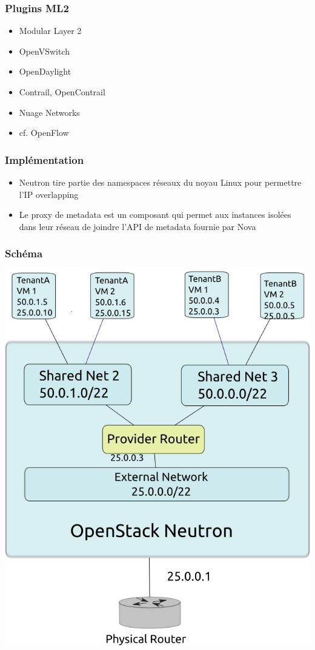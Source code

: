   \begin{frame}
    \frametitle{Plugins ML2}
    \begin{itemize}
      \item Modular Layer 2
      \item OpenVSwitch
      \item OpenDaylight
      \item Contrail, OpenContrail
      \item Nuage Networks
      \item cf. OpenFlow
    \end{itemize}
  \end{frame}

  \begin{frame}
    \frametitle{Implémentation}
    \begin{itemize}
      \item Neutron tire partie des namespaces réseaux du noyau Linux pour permettre l'IP overlapping
      \item Le proxy de metadata est un composant qui permet aux instances isolées dans leur réseau de joindre l'API de metadata fournie par Nova
    \end{itemize}
  \end{frame}

  \begin{frame}
    \frametitle{Schéma}
    \includegraphics[width=\textwidth,height=\textheight]{images/neutron-schema.png}
  \end{frame}

